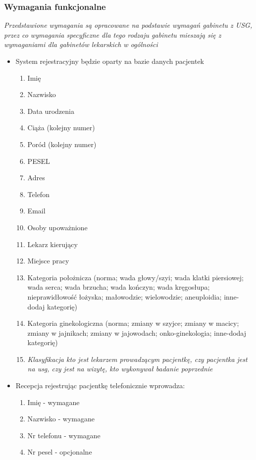 \documentclass[polish,12pt]{aghthesis}
\begin{document}
\subsubsection{Wymagania funkcjonalne}
\small\emph{Przedstawione wymagania są opracowane na podstawie wymagań gabinetu z USG, przez co wymagania specyficzne dla tego rodzaju gabinetu mieszają się z  wymaganiami dla gabinetów lekarskich w ogólności}
\begin{itemize}
    \item System rejestracyjny będzie oparty na bazie danych pacjentek \begin{enumerate}
      \item Imię
      \item Nazwisko
      \item Data urodzenia
      \item Ciąża (kolejny numer)
      \item Poród (kolejny numer)
      \item PESEL
      \item Adres
      \item Telefon
      \item Email
      \item Osoby upoważnione
      \item Lekarz kierujący
      \item Miejsce pracy
      \item Kategoria położnicza (norma; wada głowy/szyi; wada klatki piersiowej; wada serca; wada brzucha; wada kończyn; wada kręgosłupa; nieprawidłowość łożyska; małowodzie; wielowodzie; aneuploidia; inne-dodaj kategorię)
      \item Kategoria ginekologiczna (norma; zmiany w szyjce; zmiany w macicy; zmiany w jajnikach; zmiany w jajowodach; onko-ginekologia; inne-dodaj kategorię)
      \item \emph{Klasyfikacja kto jest lekarzem prowadzącym pacjentkę, czy pacjentka jest na usg, czy jest na wizytę, kto wykonywał badanie poprzednie}
    \end{enumerate}
    \item Recepcja rejestrując pacjentkę telefonicznie wprowadza: \begin{enumerate}
      \item Imię - wymagane
      \item Nazwisko - wymagane
      \item Nr telefonu - wymagane
      \item Nr pesel - opcjonalne

\end{enumerate}
\end{itemize}
\end{document}
